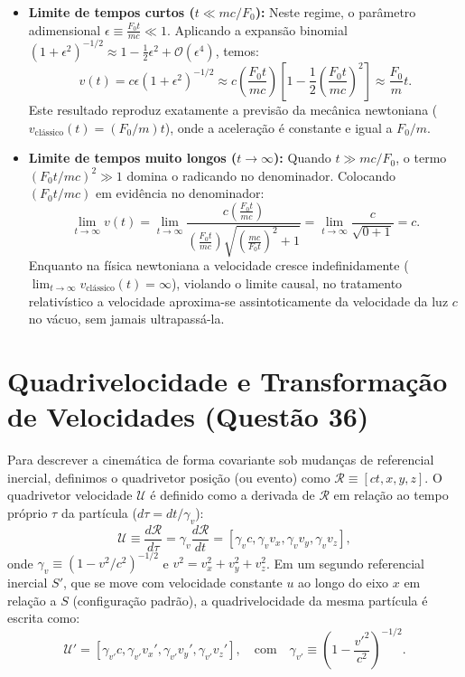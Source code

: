 \documentclass[11pt, a4paper]{article}
\begin{document}
\begin{itemize}
    \item \textbf{Limite de tempos curtos ($t \ll mc/F_0$):} Neste regime, o parâmetro adimensional $\epsilon \equiv \frac{F_0 t}{mc} \ll 1$. Aplicando a expansão binomial $(1 + \epsilon^2)^{-1/2} \approx 1 - \frac{1}{2}\epsilon^2 + \mathcal{O}(\epsilon^4)$, temos:
    \begin{equation}
    v(t) = c \epsilon (1 + \epsilon^2)^{-1/2} \approx c \left(\frac{F_0 t}{m c}\right) \left[ 1 - \frac{1}{2}\left(\frac{F_0 t}{m c}\right)^2 \right] \approx \frac{F_0}{m} t.
    \end{equation}
    Este resultado reproduz exatamente a previsão da mecânica newtoniana ($v_{\text{clássico}}(t) = (F_0/m)t$), onde a aceleração é constante e igual a $F_0/m$.

    \item \textbf{Limite de tempos muito longos ($t \to \infty$):} Quando $t \gg mc/F_0$, o termo $(F_0 t / mc)^2 \gg 1$ domina o radicando no denominador. Colocando $(F_0 t / mc)$ em evidência no denominador:
    \begin{equation}
    \lim_{t \to \infty} v(t) = \lim_{t \to \infty} \frac{c \left(\frac{F_0 t}{m c}\right)}{\left(\frac{F_0 t}{m c}\right) \sqrt{\left(\frac{m c}{F_0 t}\right)^2 + 1}} = \lim_{t \to \infty} \frac{c}{\sqrt{0 + 1}} = c.
    \end{equation}
    Enquanto na física newtoniana a velocidade cresce indefinidamente ($\lim_{t \to \infty} v_{\text{clássico}}(t) = \infty$), violando o limite causal, no tratamento relativístico a velocidade aproxima-se assintoticamente da velocidade da luz $c$ no vácuo, sem jamais ultrapassá-la.
\end{itemize}

\section{Quadrivelocidade e Transformação de Velocidades (Questão 36)}

Para descrever a cinemática de forma covariante sob mudanças de referencial inercial, definimos o quadrivetor posição (ou evento) como $\mathcal{R} \equiv [ct, x, y, z]$. O quadrivetor velocidade $\mathcal{U}$ é definido como a derivada de $\mathcal{R}$ em relação ao tempo próprio $\tau$ da partícula ($d\tau = dt/\gamma_v$):
\begin{equation}
\mathcal{U} \equiv \frac{d\mathcal{R}}{d\tau} = \gamma_v \frac{d\mathcal{R}}{dt} = [\gamma_v c, \gamma_v v_x, \gamma_v v_y, \gamma_v v_z],
\end{equation}
onde $\gamma_v \equiv (1 - v^2/c^2)^{-1/2}$ e $v^2 = v_x^2 + v_y^2 + v_z^2$. Em um segundo referencial inercial $S'$, que se move com velocidade constante $u$ ao longo do eixo $x$ em relação a $S$ (configuração padrão), a quadrivelocidade da mesma partícula é escrita como:
\begin{equation}
\mathcal{U}' = [\gamma_{v'} c, \gamma_{v'} v_x', \gamma_{v'} v_y', \gamma_{v'} v_z'], \quad \text{com} \quad \gamma_{v'} \equiv \left(1 - \frac{v'^2}{c^2}\right)^{-1/2}.
\end{equation}
\end{document}
